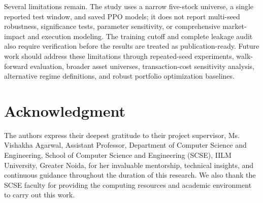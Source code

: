 \documentclass[conference]{IEEEtran}
\begin{document}
Several limitations remain. The study uses a narrow five-stock universe, a single reported test window, and saved PPO models; it does not report multi-seed robustness, significance tests, parameter sensitivity, or comprehensive market-impact and execution modeling. The training cutoff and complete leakage audit also require verification before the results are treated as publication-ready. Future work should address these limitations through repeated-seed experiments, walk-forward evaluation, broader asset universes, transaction-cost sensitivity analysis, alternative regime definitions, and robust portfolio optimization baselines.

\section*{Acknowledgment}
The authors express their deepest gratitude to their project supervisor, Ms. Vishakha Agarwal, Assistant Professor, Department of Computer Science and Engineering, School of Computer Science and Engineering (SCSE), IILM University, Greater Noida, for her invaluable mentorship, technical insights, and continuous guidance throughout the duration of this research. We also thank the SCSE faculty for providing the computing resources and academic environment to carry out this work.
\end{document}
